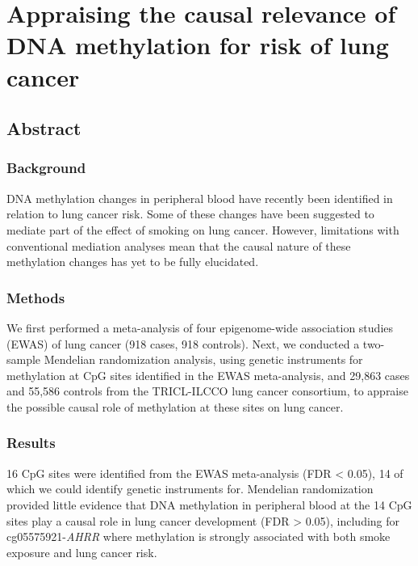 \documentclass[11pt,twoside]{bristolthesis}
\begin{document}
\hypertarget{dnam-lung-cancer-mr}{%
\chapter{Appraising the causal relevance of DNA methylation for risk of lung cancer}\label{dnam-lung-cancer-mr}}

\hypertarget{abstract-1}{%
\section{Abstract}\label{abstract-1}}

\hypertarget{background}{%
\subsection{Background}\label{background}}

DNA methylation changes in peripheral blood have recently been identified in relation to lung cancer risk. Some of these changes have been suggested to mediate part of the effect of smoking on lung cancer. However, limitations with conventional mediation analyses mean that the causal nature of these methylation changes has yet to be fully elucidated.

\hypertarget{methods-2}{%
\subsection{Methods}\label{methods-2}}

We first performed a meta-analysis of four epigenome-wide association studies (EWAS) of lung cancer (918 cases, 918 controls). Next, we conducted a two-sample Mendelian randomization analysis, using genetic instruments for methylation at CpG sites identified in the EWAS meta-analysis, and 29,863 cases and 55,586 controls from the TRICL-ILCCO lung cancer consortium, to appraise the possible causal role of methylation at these sites on lung cancer.

\hypertarget{results-1}{%
\subsection{Results}\label{results-1}}

16 CpG sites were identified from the EWAS meta-analysis (FDR \textless{} 0.05), 14 of which we could identify genetic instruments for. Mendelian randomization provided little evidence that DNA methylation in peripheral blood at the 14 CpG sites play a causal role in lung cancer development (FDR \textgreater{} 0.05), including for cg05575921-\emph{AHRR} where methylation is strongly associated with both smoke exposure and lung cancer risk.
\end{document}
